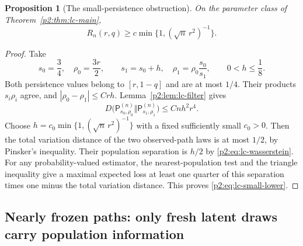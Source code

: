 \documentclass[11pt,a4paper]{article}
\newtheorem{proposition}[theorem]{Proposition}
\theoremstyle{definition}
\theoremstyle{remark}
\numberwithin{equation}{section}
\begin{document}
\begin{proposition}[The small-persistence obstruction]
\label{p2:prop:lc-small-persistence}
On the parameter class of Theorem~\ref{p2:thm:lc-main},
\begin{equation}\label{p2:eq:lc-small-lower}
 R_n(r,q)\ge c\min\{1,(\sqrt n\,r^2)^{-1}\}.
\end{equation}
\end{proposition}
\begin{proof}
Take
\[
 s_0=\frac34,\quad \rho_0=\frac{3r}{2},\qquad
 s_1=s_0+h,\quad \rho_1=\rho_0\frac{s_0}{s_1},
 \qquad 0<h\le\frac18.
\]
Both persistence values belong to $[r,1-q]$ and are at most $1/4$.
Their products $s_i\rho_i$ agree, and
$|\rho_0-\rho_1|\le Crh$.  Lemma~\ref{p2:lem:lc-filter} gives
\[
 D\bigl(\mathsf P^{(n)}_{s_0,\rho_0}
             \Vert\mathsf P^{(n)}_{s_1,\rho_1}\bigr)
     \le Cnh^2r^4.
\]
Choose $h=c_0\min\{1,(\sqrt n\,r^2)^{-1}\}$ with a fixed sufficiently
small $c_0>0$.  Then the total variation distance of the two observed-path
laws is at most $1/2$, by Pinsker's inequality.  Their population separation
is $h/2$ by \eqref{p2:eq:lc-wasserstein}.  For any probability-valued estimator,
the nearest-population test and the triangle inequality give a maximal
expected loss at least one quarter of this separation times one minus the
total variation distance.  This proves \eqref{p2:eq:lc-small-lower}.
\end{proof}

\subsection{Nearly frozen paths: only fresh latent draws carry population information}
\end{document}
